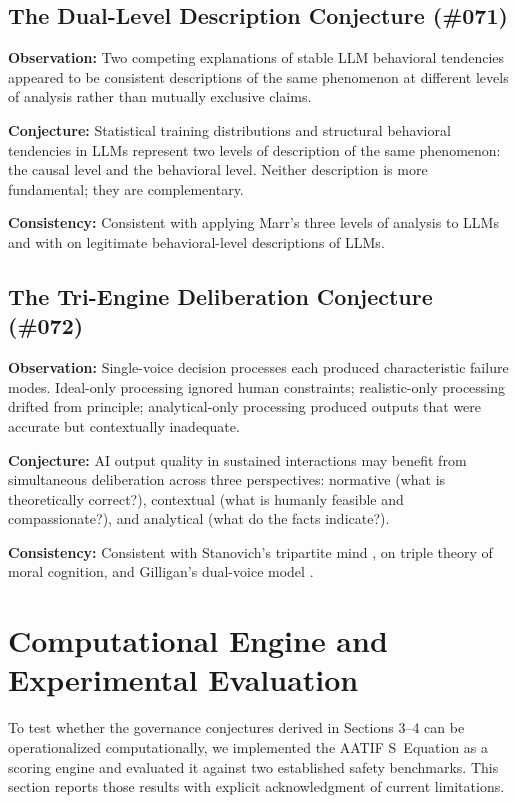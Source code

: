 \documentclass[11pt,a4paper]{article}
\begin{document}
\subsection{The Dual-Level Description Conjecture (\#071)}

\textbf{Observation:} Two competing explanations of stable LLM behavioral tendencies appeared to be consistent descriptions of the same phenomenon at different levels of analysis rather than mutually exclusive claims.

\textbf{Conjecture:} Statistical training distributions and structural behavioral tendencies in LLMs represent two levels of description of the same phenomenon: the causal level and the behavioral level. Neither description is more fundamental; they are complementary.

\textbf{Consistency:} Consistent with \citet{ku2026} applying Marr's three levels of analysis to LLMs and with \citet{shanahan2023} on legitimate behavioral-level descriptions of LLMs.

\subsection{The Tri-Engine Deliberation Conjecture (\#072)}

\textbf{Observation:} Single-voice decision processes each produced characteristic failure modes. Ideal-only processing ignored human constraints; realistic-only processing drifted from principle; analytical-only processing produced outputs that were accurate but contextually inadequate.

\textbf{Conjecture:} AI output quality in sustained interactions may benefit from simultaneous deliberation across three perspectives: normative (what is theoretically correct?), contextual (what is humanly feasible and compassionate?), and analytical (what do the facts indicate?).

\textbf{Consistency:} Consistent with Stanovich's tripartite mind \citep{stanovich2011}, \citet{levine2024} on triple theory of moral cognition, and Gilligan's dual-voice model \citep{gilligan1982}.

\section{Computational Engine and Experimental Evaluation}
\label{sec:experiments}

To test whether the governance conjectures derived in Sections 3--4 can be operationalized computationally, we implemented the AATIF S~Equation as a scoring engine and evaluated it against two established safety benchmarks. This section reports those results with explicit acknowledgment of current limitations.
\end{document}
